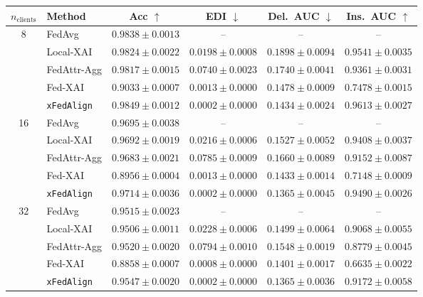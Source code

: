 \documentclass{article}
\theoremstyle{plain}
\theoremstyle{definition}
\theoremstyle{remark}
\begin{document}
\begin{table}[t]
  \centering
  \small
  \setlength{\tabcolsep}{5pt}
  \renewcommand{\arraystretch}{1.15}
  \begin{tabular}{clcccc}
    \toprule
    $n_{\text{clients}}$ & Method
    & Acc $\uparrow$
    & EDI $\downarrow$
    & Del.\ AUC $\downarrow$
    & Ins.\ AUC $\uparrow$ \\
    \midrule

    \multirow{5}{*}{8}
      & FedAvg        & $0.9838 \pm 0.0013$ & --                      & --                      & --                      \\
      & Local-XAI   & $0.9824 \pm 0.0022$ & $0.0198 \pm 0.0008$       & $0.1898 \pm 0.0094$       & $0.9541 \pm 0.0035$       \\
      & FedAttr-Agg & $0.9817 \pm 0.0015$ & $0.0740 \pm 0.0023$       & $0.1740 \pm 0.0041$       & $0.9361 \pm 0.0031$       \\
      & Fed-XAI     & $0.9033 \pm 0.0007$ & $0.0013 \pm 0.0000$       & $0.1478 \pm 0.0009$       & $0.7478 \pm 0.0015$       \\
      & \texttt{xFedAlign}      & $\mathbf{0.9849} \pm 0.0012$ & $\mathbf{0.0002} \pm 0.0000$ & $\mathbf{0.1434} \pm 0.0024$ & $\mathbf{0.9613} \pm 0.0027$ \\
    \midrule

    \multirow{5}{*}{16}
      & FedAvg        & $0.9695 \pm 0.0038$ & --                      & --                      & --                      \\
      & Local-XAI   & $0.9692 \pm 0.0019$ & $0.0216 \pm 0.0006$       & $0.1527 \pm 0.0052$       & $0.9408 \pm 0.0037$       \\
      & FedAttr-Agg & $0.9683 \pm 0.0021$ & $0.0785 \pm 0.0009$       & $0.1660 \pm 0.0089$       & $0.9152 \pm 0.0087$       \\
      & Fed-XAI     & $0.8956 \pm 0.0004$ & $0.0013 \pm 0.0000$       & $0.1433 \pm 0.0014$       & $0.7148 \pm 0.0009$       \\
      & \texttt{xFedAlign}      & $\mathbf{0.9714} \pm 0.0036$ & $\mathbf{0.0002} \pm 0.0000$ & $\mathbf{0.1365} \pm 0.0045$ & $\mathbf{0.9490} \pm 0.0026$ \\
    \midrule

    \multirow{5}{*}{32}
      & FedAvg        & $0.9515 \pm 0.0023$ & --                      & --                      & --                      \\
      & Local-XAI   & $0.9506 \pm 0.0011$ & $0.0228 \pm 0.0006$       & $0.1499 \pm 0.0064$       & $0.9068 \pm 0.0055$       \\
      & FedAttr-Agg & $0.9520 \pm 0.0020$ & $0.0794 \pm 0.0010$       & $0.1548 \pm 0.0019$       & $0.8779 \pm 0.0045$       \\
      & Fed-XAI     & $0.8858 \pm 0.0007$ & $0.0008 \pm 0.0000$       & $0.1401 \pm 0.0017$       & $0.6635 \pm 0.0022$       \\
      & \texttt{xFedAlign}      & $\mathbf{0.9547} \pm 0.0020$ & $\mathbf{0.0002} \pm 0.0000$ & $\mathbf{0.1365} \pm 0.0036$ & $\mathbf{0.9172} \pm 0.0058$ \\
    \midrule


\end{tabular}
\end{table}
\end{document}
